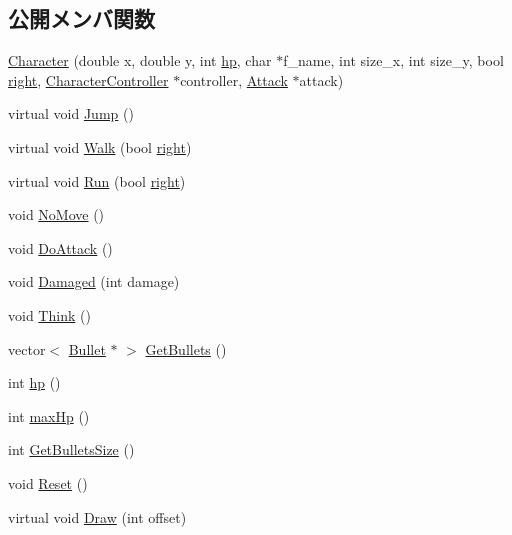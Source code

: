 \subsection*{公開メンバ関数}
\begin{DoxyCompactItemize}
\item 
\hyperlink{class_character_a6c56f5d53bfe5f5a194e2329fdae3abd}{Character} (double x, double y, int \hyperlink{class_character_a7ea1356e63b9c74e9568feec5e1c92f5}{hp}, char $\ast$f\+\_\+name, int size\+\_\+x, int size\+\_\+y, bool \hyperlink{class_a_object_a7453abe76bbddf446aa5787231428a52}{right}, \hyperlink{class_character_controller}{Character\+Controller} $\ast$controller, \hyperlink{class_attack}{Attack} $\ast$attack)
\item 
virtual void \hyperlink{class_character_a7622bdde334c8d37358218e64dd6850a}{Jump} ()
\item 
virtual void \hyperlink{class_character_a011928a158278ccaa7129514e54ce933}{Walk} (bool \hyperlink{class_a_object_a7453abe76bbddf446aa5787231428a52}{right})
\item 
virtual void \hyperlink{class_character_a8b16b07f609409c077680199b6c50ae1}{Run} (bool \hyperlink{class_a_object_a7453abe76bbddf446aa5787231428a52}{right})
\item 
void \hyperlink{class_character_a98038fd0e31c18a4d7ca5a147db30ae1}{No\+Move} ()
\item 
void \hyperlink{class_character_a97406a1d787de885f5c54b3f21fc9b89}{Do\+Attack} ()
\item 
void \hyperlink{class_character_a99682c871c2120789442f3201b257ad1}{Damaged} (int damage)
\item 
void \hyperlink{class_character_a953e7c76dce887426f74e568e5ebbe39}{Think} ()
\item 
vector$<$ \hyperlink{class_bullet}{Bullet} $\ast$ $>$ \hyperlink{class_character_abd9a81f598e6daeefaaf68cedb706481}{Get\+Bullets} ()
\item 
int \hyperlink{class_character_a7ea1356e63b9c74e9568feec5e1c92f5}{hp} ()
\item 
int \hyperlink{class_character_a1e9966d232a386c7f9cc01db9e31fc23}{max\+Hp} ()
\item 
int \hyperlink{class_character_a13eec960e58d54403e6babfa6caa11a1}{Get\+Bullets\+Size} ()
\item 
void \hyperlink{class_character_a6c1fa20d22b5ea6edc4dbd6ca9496411}{Reset} ()
\item 
virtual void \hyperlink{class_character_ad359a991510783008ee96060f247c990}{Draw} (int offset)
\end{DoxyCompactItemize}
